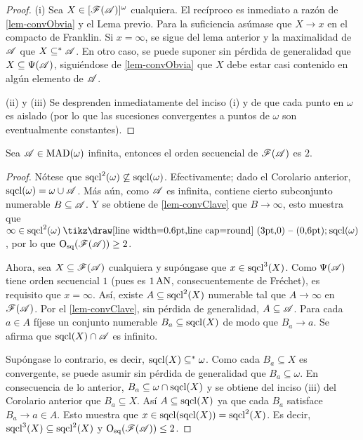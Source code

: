  \begin{proof}
  (i) Sea $X \in [\mathscr{F}(\mathscr{A})]^\omega$ cualquiera. El recíproco es inmediato a razón de \ref{lem-convObvia} y el Lema previo. Para la suficiencia asúmase que $X \to x$ en el compacto de Franklin. Si $x = \infty$, se sigue del lema anterior y la maximalidad de $\mathscr{A}$ que $X \subseteq^* \mathscr{A}$. En otro caso, se puede suponer sin pérdida de generalidad que $X \subseteq \Psi(\mathscr{A})$, siguiéndose de \ref{lem-convObvia} que $X$ debe estar casi contenido en algún elemento de $\mathscr{A}$.

  (ii) y (iii) Se desprenden inmediatamente del inciso (i) y de que cada punto en $\omega$ es aislado (por lo que las sucesiones convergentes a puntos de $\omega$ son eventualmente constantes).
 \end{proof}

 \begin{corolario}
  Sea $\mathscr{A} \in \operatorname{MAD}(\omega)$ infinita, entonces el orden secuencial de $\mathscr{F}(\mathscr{A})$ es $2$.
 \end{corolario}

 \begin{proof}
  Nótese que $\operatorname{sqcl}^2(\omega) \not\subseteq \operatorname{sqcl}(\omega)$. Efectivamente; dado el Corolario anterior, $\operatorname{sqcl}(\omega) = \omega \cup \mathscr{A}$. Más aún, como $\mathscr{A}$ es infinita, contiene cierto subconjunto numerable $B \subseteq \mathscr{A}$. Y se obtiene de \ref{lem-convClave} que $B \to \infty$, esto muestra que $\infty \in \scl^2(\omega) \setminus \scl(\omega)$, por lo que $\operatorname{O_{sq}}(\mathscr{F}(\mathscr{A})) \geq 2$.

  Ahora, sea $X \subseteq \mathscr{F}(\mathscr{A})$ cualquiera y supóngase que $x \in \operatorname{sqcl}^3(X)$. Como $\Psi(\mathscr{A})$ tiene orden secuencial $1$ (pues es $1\operatorname{AN}$, consecuentemente de Fréchet), es requisito que $x=\infty$. Así, existe $A \subseteq \operatorname{sqcl}^2(X)$ numerable tal que $A \to \infty$ en $\mathscr{F}(\mathscr{A})$. Por el \autoref{lem-convClave}, sin pérdida de generalidad, $A \subseteq \mathscr{A}$. Para cada $a \in A$ fíjese un conjunto numerable $B_a \subseteq \operatorname{sqcl}(X)$ de modo que $B_a \to a$. Se afirma que $\operatorname{sqcl}(X) \cap \mathscr{A}$ es infinito.

  Supóngase lo contrario, es decir, $\operatorname{sqcl}(X) \subseteq^* \omega$. Como cada $B_a \subseteq X$ es convergente, se puede asumir sin pérdida de generalidad que $B_a \subseteq \omega$. En consecuencia de lo anterior, $B_a \subseteq \omega \cap \operatorname{sqcl}(X)$ y se obtiene del inciso (iii) del Corolario anterior que $B_a \subseteq X$. Así $A \subseteq \operatorname{sqcl}(X)$ ya que cada $B_a$ satisface $B_a \to a \in A$. Esto muestra que $x \in \operatorname{sqcl}(\operatorname{sqcl}(X))=\operatorname{sqcl}^2(X)$. Es decir, $\operatorname{sqcl}^3(X) \subseteq \operatorname{sqcl}^2(X)$ y $\operatorname{O_{sq}}(\mathscr{F}(\mathscr{A})) \leq 2$.
 \end{proof}

